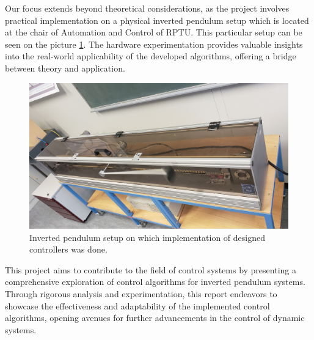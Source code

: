 Our focus extends beyond theoretical considerations, as the project involves practical implementation on a physical inverted pendulum setup which is located at the chair of Automation and Control of RPTU. This particular setup can be seen on the picture \ref{PICTURE_PENDULUM}. The hardware experimentation provides valuable insights into the real-world applicability of the developed algorithms, offering a bridge between theory and application.

\begin{figure}[!tbh]
	\centering
	\includegraphics[width=140mm]{obr/pendulumInverted.jpg}
	\caption{Inverted pendulum setup on which implementation of designed controllers was done.}\label{PICTURE_PENDULUM}
\end{figure}

This project aims to contribute to the field of control systems by presenting a comprehensive exploration of control algorithms for inverted pendulum systems. Through rigorous analysis and experimentation, this report endeavors to showcase the effectiveness and adaptability of the implemented control algorithms, opening avenues for further advancements in the control of dynamic systems.
